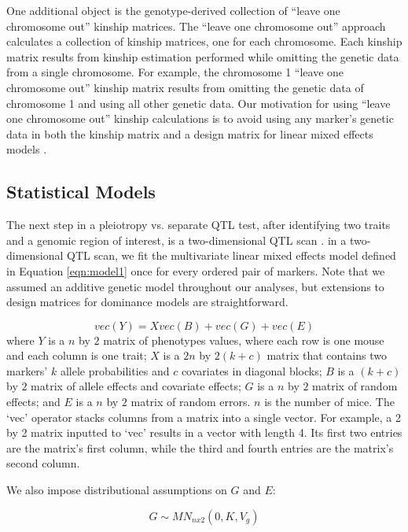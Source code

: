 \documentclass[12pt,twoside, lineno]{gsajnl}
\begin{document}
One additional object is the genotype-derived collection of ``leave one chromosome out'' kinship matrices. The ``leave one chromosome out'' approach calculates a collection of kinship matrices, one for each chromosome. Each kinship matrix results from kinship estimation performed while omitting the genetic data from a single chromosome. For example, the chromosome 1 ``leave one chromosome out'' kinship matrix results from omitting the genetic data of chromosome 1 and using all other genetic data. Our motivation for using ``leave one chromosome out'' kinship calculations is to avoid using any marker's genetic data in both the kinship matrix and a design matrix for linear mixed effects models \citep{yang2014advantages}.




\subsection{Statistical Models}
The next step in a pleiotropy vs. separate QTL test, after identifying two traits and a genomic region of interest, is a two-dimensional QTL scan \citep{jiang1995multiple}. in a two-dimensional QTL scan, we fit the multivariate linear mixed effects model defined in Equation \ref{eqn:model1} once for every ordered pair of markers. Note that we assumed an additive genetic model throughout our analyses, but extensions to design matrices for dominance models are straightforward.


\begin{equation}
vec(Y) = X vec(B) + vec(G) + vec(E)
\label{eqn:model1}
\end{equation}
where $Y$ is a $n$ by $2$ matrix of phenotypes values, where each row is one mouse and each column is one trait; $X$ is a $2n$ by $2(k + c)$ matrix that contains two markers' $k$ allele probabilities and $c$ covariates in diagonal blocks; $B$ is a $(k + c)$ by $2$ matrix of allele effects and covariate effects; $G$ is a $n$ by $2$ matrix of random effects; and $E$ is a $n$ by $2$ matrix of random errors. $n$ is the number of mice. The `vec' operator stacks columns from a matrix into a single vector. For example, a 2 by 2 matrix inputted to `vec' results in a vector with length 4. Its first two entries are the matrix's first column, while the third and fourth entries are the matrix's second column.


We also impose distributional assumptions on $G$ and $E$:

\begin{equation}
G \sim MN_{n x 2}(0, K, V_g)
\label{eqn:model2}
\end{equation}
\end{document}
